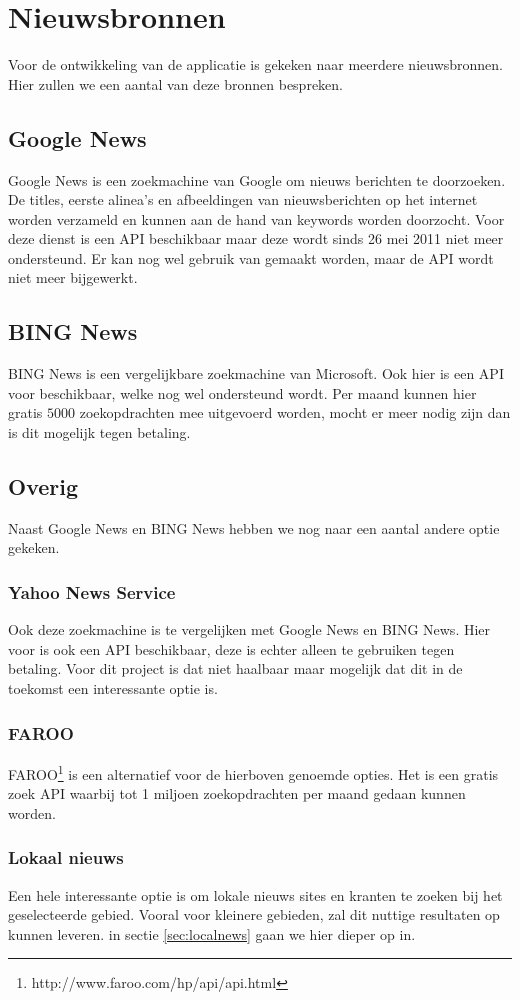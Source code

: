 \documentclass[twoside,openright]{uva-bachelor-thesis}
\begin{document}
	\section{Nieuwsbronnen}
		Voor de ontwikkeling van de applicatie is gekeken naar meerdere nieuwsbronnen. Hier zullen we een aantal van deze bronnen bespreken.
		\subsection{Google News}
			Google News is een zoekmachine van Google om nieuws berichten te doorzoeken. De titles, eerste alinea's en afbeeldingen van nieuwsberichten op het internet worden verzameld en kunnen aan de hand van keywords worden doorzocht. Voor deze dienst is een API beschikbaar maar deze wordt sinds 26 mei 2011 niet meer ondersteund. Er kan nog wel gebruik van gemaakt worden, maar de API wordt niet meer bijgewerkt. 
		\subsection{BING News}
			BING News is een vergelijkbare zoekmachine van Microsoft. Ook hier is een API voor beschikbaar, welke nog wel ondersteund wordt. Per maand kunnen hier gratis $5000$ zoekopdrachten mee uitgevoerd worden, mocht er meer nodig zijn dan is dit mogelijk tegen betaling.
		\subsection{Overig}
			Naast Google News en BING News hebben we nog naar een aantal andere optie gekeken.
			\subsubsection{Yahoo News Service}
				Ook deze zoekmachine is te vergelijken met Google News en BING News. Hier voor is ook een API beschikbaar, deze is echter alleen te gebruiken tegen betaling. Voor dit project is dat niet haalbaar maar mogelijk dat dit in de toekomst een interessante optie is.
			\subsubsection{FAROO}
				FAROO\footnote{http://www.faroo.com/hp/api/api.html} is een alternatief voor de hierboven genoemde opties. Het is een gratis zoek API waarbij tot 1 miljoen zoekopdrachten per maand gedaan kunnen worden. 
			\subsubsection{Lokaal nieuws}
				Een hele interessante optie is om lokale nieuws sites en kranten te zoeken bij het geselecteerde gebied. Vooral voor kleinere gebieden, zal dit nuttige resultaten op kunnen leveren. in sectie \ref{sec:localnews} gaan we hier dieper op in.
\end{document}
